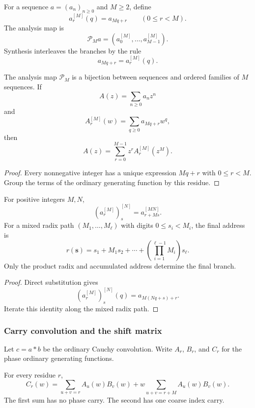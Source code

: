 For a sequence \(a=(a_n)_{n\geq0}\) and \(M\geq2\), define
\[
a_r^{[M]}(q)=a_{Mq+r}
\qquad(0\leq r<M).
\]
The analysis map is
\[
\mathcal P_Ma
=
\left(a_0^{[M]},\ldots,a_{M-1}^{[M]}\right).
\]
Synthesis interleaves the branches by the rule
\[
a_{Mq+r}=a_r^{[M]}(q).
\]

\begin{histtheorem}\label{hist:thm:discrete_polyphase_reconstruction}
The analysis map \(\mathcal P_M\) is a bijection between sequences and ordered families of \(M\) sequences. If
\[
A(z)=\sum_{n\geq0}a_nz^n
\]
and
\[
A_r^{[M]}(w)=\sum_{q\geq0}a_{Mq+r}w^q,
\]
then
\[
\boxed{
A(z)=\sum_{r=0}^{M-1}z^rA_r^{[M]}(z^M).
}
\]
\end{histtheorem}

\begin{proof}
Every nonnegative integer has a unique expression \(Mq+r\) with \(0\leq r<M\). Group the terms of the ordinary generating function by this residue.
\end{proof}

\begin{histtheorem}\label{hist:thm:nested_discrete_polyphase}
For positive integers \(M,N\),
\[
\boxed{
\left(a_r^{[M]}\right)_s^{[N]}
=
a_{r+Ms}^{[MN]}.
}
\]
For a mixed radix path \((M_1,\ldots,M_\ell)\) with digits \(0\leq s_i<M_i\), the final address is
\[
\boxed{
r(\boldsymbol s)
=
s_1+M_1s_2+\cdots+
\left(\prod_{i=1}^{\ell-1}M_i\right)s_\ell.
}
\]
Only the product radix and accumulated address determine the final branch.
\end{histtheorem}

\begin{proof}
Direct substitution gives
\[
\left(a_r^{[M]}\right)_s^{[N]}(q)
=
a_{M(Nq+s)+r}.
\]
Iterate this identity along the mixed radix path.
\end{proof}

\subsubsection{Carry convolution and the shift matrix}

Let \(c=a*b\) be the ordinary Cauchy convolution. Write \(A_r\), \(B_r\), and \(C_r\) for the phase ordinary generating functions.

\begin{histproposition}\label{hist:prop:polyphase_carry_convolution}
For every residue \(r\),
\[
\boxed{
C_r(w)
=
\sum_{u+v=r}A_u(w)B_v(w)
+
w\sum_{u+v=r+M}A_u(w)B_v(w).
}
\]
The first sum has no phase carry. The second has one coarse index carry.
\end{histproposition}


